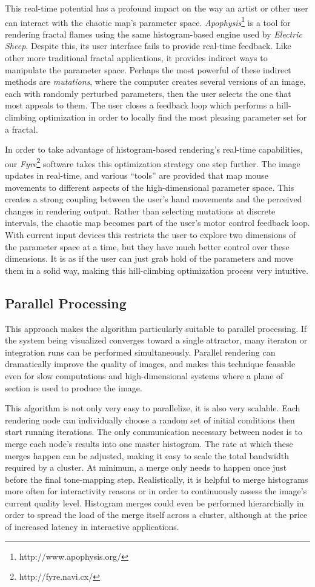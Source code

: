 \documentclass[letterpaper, 11pt]{article}
\begin{document}
This real-time potential has a profound impact on the way an artist or other user can
interact with the chaotic map's parameter space. \emph{Apophysis}\footnote{http://www.apophysis.org/}
is a tool for rendering fractal flames using the same histogram-based engine used by \emph{Electric Sheep}.
Despite this, its user interface fails to provide real-time feedback. Like other more traditional
fractal applications, it provides indirect ways to manipulate the parameter space. Perhaps the most
powerful of these indirect methods are \emph{mutations}, where the computer creates several versions
of an image, each with randomly perturbed parameters, then the user selects the one that most appeals
to them. The user closes a feedback loop which performs a hill-climbing optimization in order
to locally find the most pleasing parameter set for a fractal.

In order to take advantage of histogram-based rendering's real-time capabilities, our
\emph{Fyre}\footnote{http://fyre.navi.cx/} software takes this optimization strategy one step
further. The image updates in real-time, and various ``tools'' are provided that map mouse movements
to different aspects of the high-dimensional parameter space. This creates a strong coupling
between the user's hand movements and the perceived changes in rendering output. Rather than
selecting mutations at discrete intervals, the chaotic map becomes part of the user's motor control
feedback loop. With current input devices this restricts the user to explore two dimensions of the
parameter space at a time, but they have much better control over these dimensions. It is as if the
user can just grab hold of the parameters and move them in a solid way, making this hill-climbing
optimization process very intuitive.

\subsection{Parallel Processing}
This approach makes the algorithm particularly suitable to parallel processing.  If the
system being visualized converges toward a single attractor, many iteraton or integration
runs can be performed simultaneously.
Parallel rendering can dramatically improve the quality of images, and makes
this technique feasable even for slow computations and high-dimensional systems where a
plane of section is used to produce the image.

This algorithm is not only very easy to parallelize, it is
also very scalable. Each rendering node can individually choose a random
set of initial conditions then start running iterations. The only communication necessary between
nodes is to merge each node's results into one master histogram. The rate at which these merges
happen can be adjusted, making it easy to scale the total bandwidth required by a cluster.
At minimum, a merge only needs to happen once just before the final tone-mapping
step. Realistically, it is helpful to merge histograms more often for interactivity reasons
or in order to continuously assess the image's current quality level. Histogram merges could even
be performed hierarchially in order to spread the load of the merge itself across a cluster, although
at the price of increased latency in interactive applications.
\end{document}
